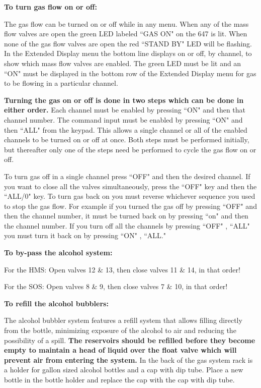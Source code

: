 {\bf To turn gas flow on or off:}

The gas flow can be turned on or off while in any menu.  When any
of the mass flow valves are open the green LED labeled ``GAS ON" on the 647
is lit.  When none of the gas flow valves are open the red ``STAND BY" LED
will be flashing.  In the Extended Display menu the bottom line displays on
or off, by channel, to show which mass flow valves are enabled.  The green
LED must be lit and an ``ON" must be displayed in the bottom row of the
Extended Display menu for gas to be flowing in a particular channel.

{\bf Turning the gas on or off is done in two steps which can be done in
either order.}
Each channel must be enabled by pressing ``ON" and then
that channel number.  The command input must be enabled by pressing ``ON"
and then ``ALL" from the keypad.  This allows a single channel or all of the
enabled channels to be turned on or off at once.  Both steps must be
performed initially, but thereafter only one of the steps need be performed
to cycle the gas flow on or off.

To turn gas off in a single channel press ``OFF" and then the
desired channel.  If you want to close all the valves simultaneously, press
the ``OFF" key and then the ``ALL/0" key.  To turn gas back on you must
reverse whichever sequence you used to stop the gas flow.  For example if
you turned the gas off by pressing ``OFF" and then the channel number, it
must be turned back on by pressing ``on" and then the channel number.  If
you turn off all the channels by pressing ``OFF" , ``ALL" you must turn it
back on by pressing ``ON" , ``ALL."

{\bf To by-pass the alcohol system:}

For the HMS:
Open valves 12 \& 13, then close valves 11 \& 14, in that order!

For the SOS:
Open valves 8 \& 9, then close valves 7 \& 10, in that order!

{\bf To refill the alcohol bubblers:}

The alcohol bubbler system features a refill system that allows
filling directly from the bottle, minimizing exposure of the alcohol to air
and reducing the possibility of a spill.
{\bf The reservoirs should be refilled
before they become empty to maintain a head of liquid over the float valve
which will prevent air from entering the system.}
In the back of the gas
system rack is a holder for gallon sized alcohol bottles and a cap with dip
tube.  Place a new bottle in the bottle holder and replace the cap with the
cap with dip tube.

